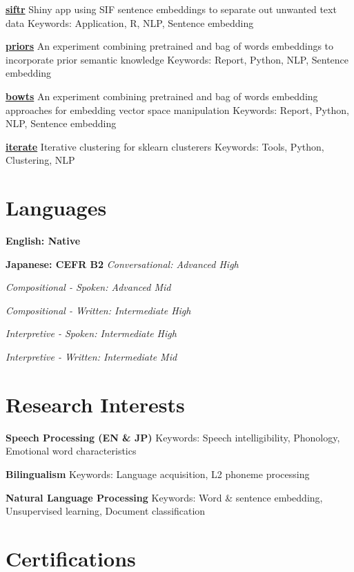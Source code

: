\documentclass[a4paper,9pt]{extarticle}
\begin{document}
\noindent
\textbf{\href{https://github.com/ryancahildebrandt/siftr}{siftr}}
Shiny app using SIF sentence embeddings to separate out unwanted text data
Keywords: Application, R, NLP, Sentence embedding

\noindent
\textbf{\href{https://github.com/ryancahildebrandt/priors}{priors}}
An experiment combining pretrained and bag of words embeddings to incorporate prior semantic knowledge
Keywords: Report, Python, NLP, Sentence embedding

\noindent
\textbf{\href{https://github.com/ryancahildebrandt/bowts}{bowts}}
An experiment combining pretrained and bag of words embedding approaches for embedding vector space manipulation
Keywords: Report, Python, NLP, Sentence embedding

\noindent
\textbf{\href{https://github.com/ryancahildebrandt/iterate}{iterate}}
Iterative clustering for sklearn clusterers
Keywords: Tools, Python, Clustering, NLP

\section*{Languages}

\noindent
\textbf{English: Native}

\noindent
\textbf{Japanese: CEFR B2}
\textit{Conversational: Advanced High}

\textit{Compositional - Spoken: Advanced Mid}

\textit{Compositional - Written: Intermediate High}

\textit{Interpretive - Spoken: Intermediate High}

\textit{Interpretive - Written: Intermediate Mid}

\section*{Research Interests}

\noindent
\textbf{Speech Processing (EN \& JP)}
Keywords: Speech intelligibility, Phonology, Emotional word characteristics

\noindent
\textbf{Bilingualism}
Keywords: Language acquisition, L2 phoneme processing

\noindent
\textbf{Natural Language Processing}
Keywords: Word \& sentence embedding, Unsupervised learning, Document classification

\section*{Certifications}
\end{document}
